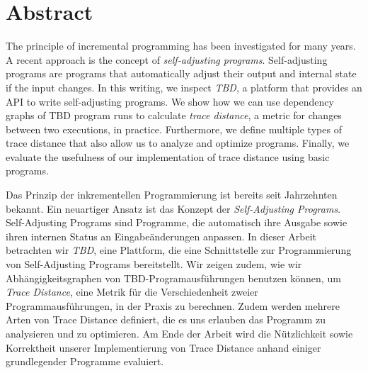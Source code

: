 \documentclass{thesisclass}
\begin{document}
\chapter*{Abstract}
The principle of incremental programming has been investigated for many years. A recent approach is the concept of \textit{self-adjusting programs}. Self-adjusting programs are programs that automatically adjust their output and internal state if the input changes. In this writing, we inspect \textit{TBD}, a platform that provides an API to write self-adjusting programs. We show how we can use dependency graphs of TBD program runs to calculate \textit{trace distance}, a metric for changes between two executions, in practice. Furthermore, we define multiple types of trace distance that also allow us to analyze and optimize programs. Finally, we evaluate the usefulness of our implementation of trace distance using basic programs. 

\vspace{10 mm}

Das Prinzip der inkrementellen Programmierung ist bereits seit Jahrzehnten bekannt. Ein neuartiger Ansatz ist das Konzept der \textit{Self-Adjusting Programs}. Self-Adjusting Programs sind Programme, die automatisch ihre Ausgabe sowie ihren internen Status an Eingabe\"anderungen anpassen. In dieser Arbeit betrachten wir \textit{TBD}, eine Plattform, die eine Schnittstelle zur Programmierung von Self-Adjusting Programs bereitstellt. Wir zeigen zudem, wie wir Abh\"angigkeitsgraphen von TBD-Programausf\"uhrungen benutzen k\"onnen, um \textit{Trace Distance}, eine Metrik f\"ur die Verschiedenheit zweier Programmausf\"uhrungen, in der Praxis zu berechnen. Zudem werden mehrere Arten von Trace Distance definiert, die es uns erlauben das Programm zu analysieren und zu optimieren. Am Ende der Arbeit wird die N\"utzlichkeit sowie Korrektheit unserer Implementierung von Trace Distance anhand einiger grundlegender Programme evaluiert. 


\tableofcontents
\blankpage


\mainmatter
{}




\cleardoublepage
{}
{}

{}	%
{}	%
												  




\cleardoublepage


\end{document}
